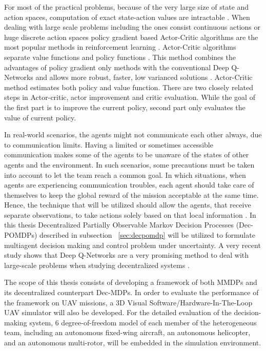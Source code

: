 \documentclass{ituphdreport}
\begin{document}
For most of the practical problems, because of the very large size of state and action spaces, computation of exact state-action values are intractable \cite{Vijaymohan2002}. When dealing with large scale problems including the ones consist continuous actions or huge discrete action spaces policy gradient based Actor-Critic algorithms are the most popular methods in reinforcement learning \cite{grondman2012survey}. Actor-Critic algorithms separate value functions and policy functions \cite{mnih2016asynchronous}. This method combines the advantages of policy gradient only methods with the conventional Deep Q-Networks and allows more robust, faster, low varianced solutions \cite{grondman2012survey}. Actor-Critic method estimates both policy and value function. There are two closely related steps in Actor-critic, actor improvement and critic evaluation. While the goal of the first part is to improve the current policy, second part only evaluates the value of current policy. 

In real-world scenarios, the agents might not communicate each other always, due to communication limits. Having a limited or sometimes accessible communication makes some of the agents to be unaware of the states of other agents and the environment. In such scenarios, some precautions must be taken into account to let the team reach a common goal. In which situations, when agents are experiencing communication troubles, each agent should take care of themselves to keep the global reward of the mission acceptable at the same time. Hence, the technique that will be utilized should allow the agents, that receive separate observations, to take actions solely based on that local information \cite{amato13}. In this thesis Decentralized Partially Observable Markov Decision Processes (Dec-POMDPs) described in subsection ~\ref{sec:decpomdp} will be utilized to formulate multiagent decision making and control problem under uncertainty. A very recent study shows that Deep Q-Networks are a very promising method to deal with large-scale problems when studying decentralized systems \cite{chen2016decentralized}.

The scope of this thesis consists of developing a framework of both MMDPs and its decentralized counterpart Dec-MDPs. In order to evaluate the performance of the framework on UAV missions, a 3D Visual Software/Hardware-In-The-Loop UAV simulator will also be developed. For the detailed evaluation of the decision-making system, 6 degree-of-freedom model of each member of the heterogeneous team, including an autonomous fixed-wing aircraft, an autonomous helicopter, and an autonomous multi-rotor, will be embedded in the simulation environment.
\end{document}
